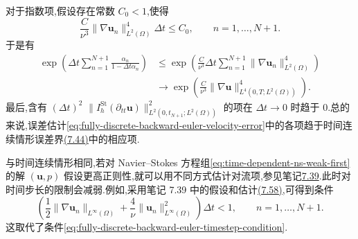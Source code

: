 \begin{note}[关于误差估计(7.107)]
\begin{itemize}
对于指数项,假设存在常数 $C_0<1$,使得
\[
 \frac{C}{\nu^3}\|\nabla\bm{u}_n\|_{L^2(\Omega)}^4\Delta t
 \le C_0,
 \qquad n=1,\ldots,N+1.
\]
于是有
\begin{equation}\label{eq:backward-euler-exponential-limit}
\begin{aligned}
 \exp\!\left(\Delta t\sum_{n=1}^{N+1}
   \frac{\alpha_n}{1-\Delta t\alpha_n}\right)
 &\le \exp\!\left(\frac{C}{\nu^3}\Delta t
   \sum_{n=1}^{N+1}\|\nabla\bm{u}_n\|_{L^2(\Omega)}^4\right)\\
 &\longrightarrow
   \exp\!\left(\frac{C}{\nu^3}
   \|\nabla\bm{u}\|_{L^4(0,T;L^2(\Omega))}^4\right).
\end{aligned}
\end{equation}
最后,含有 $(\Delta t)^2$
$\|I_h^{\mathrm{St}}(\partial_{tt}\bm{u})\|_{L^2(0,t_{N+1};L^2(\Omega))}^2$ 的项在 $\Delta t\to0$ 时趋于 $0$.总的来说,误差估计\cref{eq:fully-discrete-backward-euler-velocity-error}中的各项趋于时间连续情形误差界\hyperref[eq:time-dependent-fem-velocity-error]{(7.44)}中的相应项.
\end{itemize}
\end{note}

\begin{note}[更高正则性假设]\label{note:fully-discrete-backward-euler-higher-regularity}
与时间连续情形相同,若对 Navier--Stokes 方程组\cref{eq:time-dependent-ns-weak-first}的解 $(\bm{u},p)$ 假设更高正则性,就可以用不同方式估计对流项,参见笔记\hyperref[note:time-dependent-fem-error-viscosity-regularity]{7.39}.此时对时间步长的限制会减弱.例如,采用笔记 7.39 中的假设和估计\hyperref[eq:time-dependent-fem-error-higher-regularity]{(7.58)},可得到条件
\begin{equation}\label{eq:fully-discrete-backward-euler-regularity-timestep-bound}
 \left(\frac12\|\nabla\bm{u}_n\|_{L^\infty(\Omega)}
   +\frac4\nu\|\bm{u}_n\|_{L^\infty(\Omega)}^2\right)\Delta t<1,
 \qquad n=1,\ldots,N+1.
\end{equation}
这取代了条件\cref{eq:fully-discrete-backward-euler-timestep-condition}.
\end{note}

